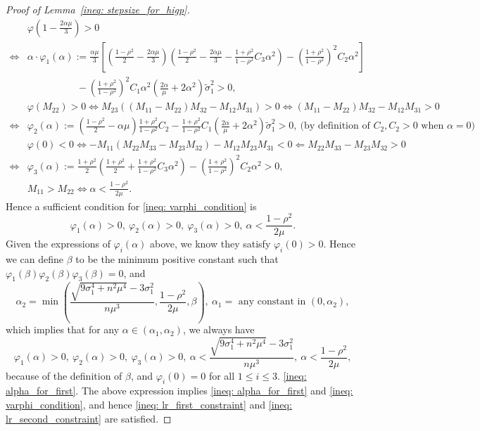 \documentclass{article}
\theoremstyle{plain}
\theoremstyle{definition}
\theoremstyle{remark}
\begin{document}
\begin{proof}[Proof of Lemma~\ref{ineq: stepsize_for_higp}]
    \begin{align*}
        &\varphi\left(1-\frac{2\alpha\mu}{3}\right) > 0 \\
        \Leftrightarrow &\alpha\cdot \varphi_1(\alpha):=\frac{\alpha\mu}{3}\left[\left(\frac{1-\rho^2}{2} - \frac{2\alpha\mu}{3}\right)\left(\frac{1-\rho^2}{2} - \frac{2\alpha\mu}{3} - \frac{1+\rho^2}{1-\rho^2}C_3\alpha^2\right) - \left(\frac{1+\rho^2}{1-\rho^2}\right)^2C_2\alpha^2\right] \\
        &\hspace{5em} - \left(\frac{1+\rho^2}{1-\rho^2}\right)^2C_1\alpha^2\left(\frac{2\alpha}{\mu} + 2\alpha^2\right)\tilde{\sigma}_1^2 > 0, \\
        &\varphi(M_{22}) > 0 \Leftrightarrow M_{23}((M_{11} - M_{22})M_{32} - M_{12}M_{31}) > 0 \Leftrightarrow (M_{11} - M_{22})M_{32} - M_{12}M_{31} > 0\\
        \Leftrightarrow&\varphi_2(\alpha):= \left(\frac{1-\rho^2}{2} - \alpha\mu\right)\frac{1+\rho^2}{1-\rho^2}C_2 - \frac{1+\rho^2}{1-\rho^2}C_1\left(\frac{2\alpha}{\mu} + 2\alpha^2\right)\tilde{\sigma}_1^2 > 0,\ \text{(by definition of } C_2, C_2 > 0 \text{ when }\alpha = 0 \text{)}\\
        &\varphi(0)<0 \Leftrightarrow -M_{11}(M_{22}M_{33} - M_{23}M_{32}) - M_{12}M_{23}M_{31} < 0 \Leftarrow M_{22}M_{33} - M_{23}M_{32} >0 \\
        \Leftrightarrow &\varphi_3(\alpha) := \frac{1+\rho^2}{2}\left(\frac{1+\rho^2}{2} + \frac{1+\rho^2}{1-\rho^2}C_3\alpha^2\right) - \left(\frac{1+\rho^2}{1-\rho^2}\right)^2C_2\alpha^2 > 0, \\
        &M_{11} > M_{22}\Leftrightarrow \alpha< \frac{1-\rho^2}{2\mu}.
    \end{align*}
    Hence a sufficient condition for \eqref{ineq: varphi_condition} is
    \[
        \varphi_1(\alpha) > 0,\ \varphi_2(\alpha) >0,\ \varphi_3(\alpha) > 0,\ \alpha < \frac{1-\rho^2}{2\mu}.
    \]
    Given the expressions of $\varphi_i(\alpha)$ above, we know they satisfy $\varphi_i(0) > 0$. Hence we can define $\beta$ to be the minimum positive constant such that $\varphi_1(\beta)\varphi_2(\beta)\varphi_3(\beta) = 0$, and 
    \[
        \alpha_2 = \min\left(\frac{\sqrt{9\sigma_1^4 + n^2\mu^4} - 3\sigma_1^2}{n\mu^3}, \frac{1-\rho^2}{2\mu}, \beta\right),\ \alpha_1 = \text{ any constant in } (0,\alpha_2),
    \]
    which implies that for any $\alpha\in (\alpha_1,\alpha_2)$, we always have
    \[
        \varphi_1(\alpha) > 0,\ \varphi_2(\alpha) >0,\ \varphi_3(\alpha) > 0,\ \alpha < \frac{\sqrt{9\sigma_1^4 + n^2\mu^4} - 3\sigma_1^2}{n\mu^3},\ \alpha < \frac{1-\rho^2}{2\mu},
    \]
    because of the definition of $\beta$, and $\varphi_i(0) = 0$ for all $1\leq i\leq 3$.  \eqref{ineq: alpha_for_first}. The above expression implies \eqref{ineq: alpha_for_first} and \eqref{ineq: varphi_condition}, and hence \eqref{ineq: lr_first_constraint} and \eqref{ineq: lr_second_constraint} are satisfied.
\end{proof}
\end{document}
